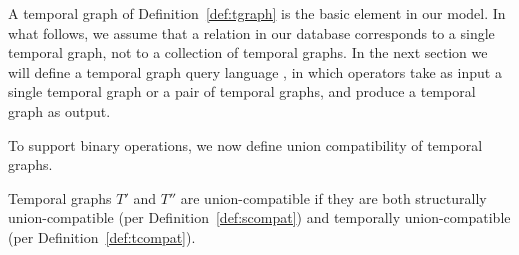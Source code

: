 A  temporal graph of Definition~\ref{def:tgraph} is the basic
element in our model.  In what follows, we assume that a relation in
our database corresponds to a single temporal graph, not to a
collection of temporal graphs.  In the next section we will define a
temporal graph query language \ql, in which operators take as input a
single temporal graph or a pair of temporal graphs, and produce a
temporal graph as output.

To support binary operations, we now define union compatibility of
temporal graphs.

\begin{definition} 
\label{def:tuc} Temporal graphs $T'$ and $T''$ are union-compatible if they are both
structurally union-compatible (per Definition~\ref{def:scompat}) and
temporally union-compatible (per Definition~\ref{def:tcompat}).
\end{definition}




